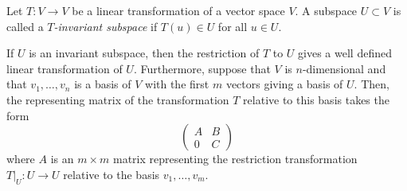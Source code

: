 \documentclass{article}
\begin{document}
Let $T: V\rightarrow V$ be a linear transformation of a vector space $V$.   A subspace $U\subset V$ is
called a {\em $T$-invariant subspace} if $T(u)\in U$ for all $u\in U$.

If $U$ is an invariant subspace, then the restriction of $T$ to $U$
gives a well defined linear transformation of $U$.  Furthermore,
suppose that $V$ is $n$-dimensional and that $v_1,\ldots, v_n$ is a
basis of $V$ with the first $m$ vectors giving a basis of $U$.  Then,
the representing matrix of the transformation $T$ relative to this
basis takes the form
$$
\begin{pmatrix}
  A & B \\
  0 & C
\end{pmatrix}$$
where $A$ is an $m\times m$ matrix representing the restriction
transformation $T\big|_U:U\to U$ relative to the basis $v_1,\ldots, v_m$.
\end{document}

